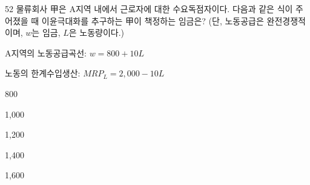 \begin{question}{52}
물류회사 甲은 A지역 내에서 근로자에 대한 수요독점자이다. 다음과 같은 식이 주어졌을 때 이윤극대화를 추구하는 甲이 책정하는 임금은? (단, 노동공급은 완전경쟁적이며, $w$는 임금, $L$은 노동량이다.)
\begin{framedtext}
A지역의 노동공급곡선: $w=800+10L$ \par
노동의 한계수입생산: $MRP_{L}=2{,}000-10L$ \par
\end{framedtext}
\begin{choices}
  \item 800
  \item 1,000
  \item 1,200
  \item 1,400
  \item 1,600
\end{choices}
\end{question}
